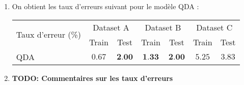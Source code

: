 \documentclass{article}
\begin{document}
\begin{enumerate}[label=(\alph*)]
\item On obtient les taux d'erreurs suivant pour le modèle QDA :
\begin{center}
\begin{tabular}{|l|c|c|c|c|c|c|}
\hline
\multirow{2}{*}{Taux d'erreur (\%)} & \multicolumn{2}{c|}{Dataset A} & \multicolumn{2}{c|}{Dataset B} & \multicolumn{2}{c|}{Dataset C}\\
& Train & Test & Train & Test & Train & Test\\
\hline
QDA & $0.67$ & $\textbf{2.00}$ & $\textbf{1.33}$ & $\textbf{2.00}$ & $5.25$ & $3.83$\\
\hline
\end{tabular}
\end{center}

\item \textbf{TODO: Commentaires sur les taux d'erreurs}
\end{enumerate}
\end{document}
